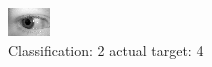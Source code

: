 \begin{figure}[h!]
\begin{center}
\includegraphics[width=0.60\columnwidth]{figures/ID788_class_2_target_4.png}
\end{center}
\caption{ Classification: 2 actual target: 4}
\label{fig:ID788_class_2_target_4}
\end{figure}
